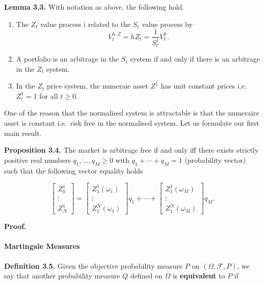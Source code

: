 \documentclass[
]{article}
\providecommand{\tightlist}{%
  \setlength{\itemsep}{0pt}\setlength{\parskip}{0pt}}
\begin{document}
\textbf{Lemma 3.3.} With notation as above, the following hold.

\begin{enumerate}
\def\labelenumi{\arabic{enumi}.}
\tightlist
\item
  The \(Z_t\) value process i related to the \(S_t\) value process by \[
    V_t^{h,Z}=hZ_t=\frac{1}{S_t^1}V_t^h.
    \]
\item
  A portfolio is an arbitrage in the \(S_t\) system if and only if there
  is an arbitrage in the \(Z_t\) system.
\item
  In the \(Z_t\) price system, the numeraie asset \(Z^1\) has unit
  constant prices i.e.~\(Z_t^1=1\) for all \(t\ge 0\).
\end{enumerate}

One of the reason that the normalised system is attractable is that the
numeraire asset is constant i.e.~risk free in the normalised system. Let
us formulate our first main result.

\textbf{Proposition 3.4.} The market is arbitrage free if and only iff
there exists strictly positive real numbers \(q_1,...,q_M\ge 0\) with
\(q_1+\cdots + q_M=1\) (probability vector) such that the following
vector equality holds

\[
\begin{bmatrix} Z_0^1\\
\vdots\\
Z_N^1\end{bmatrix}=\begin{bmatrix} Z_1^1(\omega_1)\\
\vdots\\
Z_1^N(\omega_1)\end{bmatrix}q_1+\cdots +\begin{bmatrix} Z_1^1(\omega_M)\\
\vdots\\
Z_1^N(\omega_M)\end{bmatrix}q_M.\tag{3.3}
\]

\textbf{Proof.}

\hypertarget{martingale-measures}{%
\paragraph{Martingale Measures}\label{martingale-measures}}

\textbf{Definition 3.5.} Given the objective probability measure \(P\)
on \((\Omega,\mathcal{F},P)\), we say that another probability measure
\(Q\) defined on \(\Omega\) is \textbf{equivalent} to \(P\) if
\end{document}

